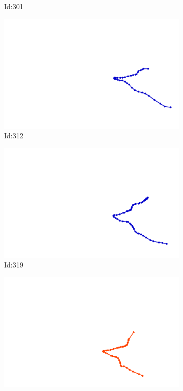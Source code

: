 \documentclass[12pt,twoside]{report}
\begin{document}
\begin{figure}
\begin{subfigure}[b]{0.20\textwidth}
\caption{Id:301}
\end{subfigure}
\begin{subfigure}[b]{0.20\textwidth}
\centering
\includegraphics[width=\textwidth]{../../trajectories/312.png}
\caption{Id:312}
\end{subfigure}
\begin{subfigure}[b]{0.20\textwidth}
\centering
\includegraphics[width=\textwidth]{../../trajectories/319.png}
\caption{Id:319}
\end{subfigure}
\begin{subfigure}[b]{0.20\textwidth}
\centering
\includegraphics[width=\textwidth]{../../trajectories/548.png}

\end{subfigure}
\end{figure}
\end{document}
